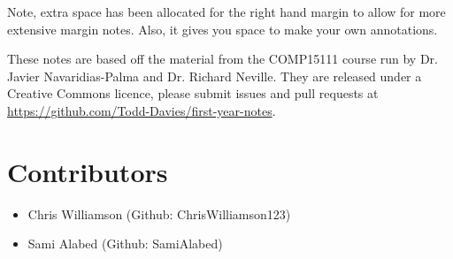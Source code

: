 \documentclass{article}
\begin{document}


\rhead{\Title}
\chead{}

\maketitle

{\small Note, extra space has been allocated for the right hand margin to allow
for more extensive margin notes. Also, it gives you space to make your own
annotations.}

{\small These notes are based off the material from the COMP15111 course run by 
Dr. Javier Navaridias-Palma and Dr. Richard Neville. They are released
under a Creative Commons licence, please submit issues and pull requests at
\url{https://github.com/Todd-Davies/first-year-notes}.}

\section*{Contributors}

\begin{itemize}
  \item Chris Williamson (Github: ChrisWilliamson123)
  \item Sami Alabed (Github: SamiAlabed)
\end{itemize}

\tableofcontents
\newpage


\end{document}
